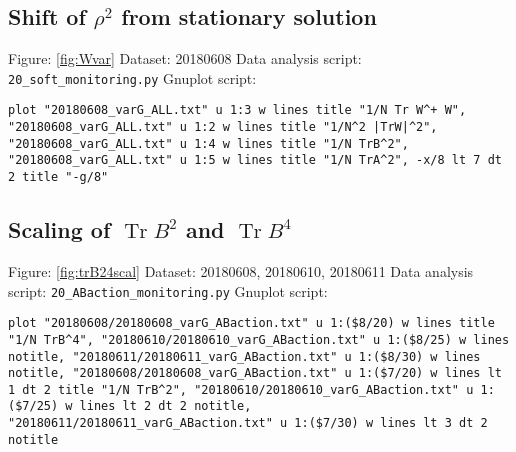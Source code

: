 \documentclass[12pt,a4paper]{article}
\DeclareMathOperator{\Tr}{Tr}
\begin{document}
\subsection{Shift of $\rho^2$ from stationary solution}
Figure: \ref{fig:Wvar} \newline
Dataset: 20180608\newline
Data analysis script: \verb|20_soft_monitoring.py|\newline
Gnuplot script:
\begin{lstlisting}
plot "20180608_varG_ALL.txt" u 1:3 w lines title "1/N Tr W^+ W", "20180608_varG_ALL.txt" u 1:2 w lines title "1/N^2 |TrW|^2", "20180608_varG_ALL.txt" u 1:4 w lines title "1/N TrB^2", "20180608_varG_ALL.txt" u 1:5 w lines title "1/N TrA^2", -x/8 lt 7 dt 2 title "-g/8"
\end{lstlisting}

\subsection{Scaling of $\Tr B^2$ and $\Tr B^4$}
Figure: \ref{fig:trB24scal} \newline
Dataset: 20180608, 20180610, 20180611\newline
Data analysis script: \verb|20_ABaction_monitoring.py|\newline
Gnuplot script:
\begin{lstlisting}
plot "20180608/20180608_varG_ABaction.txt" u 1:($8/20) w lines title "1/N TrB^4", "20180610/20180610_varG_ABaction.txt" u 1:($8/25) w lines notitle, "20180611/20180611_varG_ABaction.txt" u 1:($8/30) w lines notitle, "20180608/20180608_varG_ABaction.txt" u 1:($7/20) w lines lt 1 dt 2 title "1/N TrB^2", "20180610/20180610_varG_ABaction.txt" u 1:($7/25) w lines lt 2 dt 2 notitle, "20180611/20180611_varG_ABaction.txt" u 1:($7/30) w lines lt 3 dt 2 notitle
\end{lstlisting}
\end{document}
